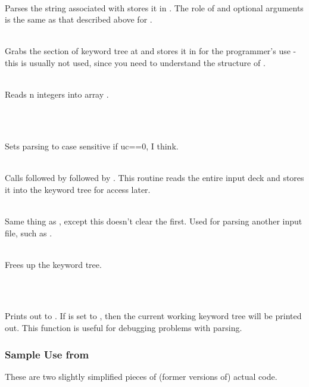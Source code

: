 \\
Parses the string associated with  stores it in .
The role of  and optional arguments is the same as that
described above for .

 \\
Grabs the section of keyword tree at  and stores it in 
for the programmer's use - this is usually not used, since you need to 
understand the structure of .

 \\
Reads n integers into array .

\begin{center}  \\ \end{center}

 \\
Sets parsing to case sensitive if uc==0, I think.

 \\
Calls  followed by  followed by 
.  This routine reads the entire input deck
and stores it into the keyword tree for access later.

 \\
Same thing as , except this doesn't clear the 
 first.  Used for parsing another input file, such 
as .

 \\
Frees up the keyword tree.

\begin{center}  \\ \end{center}

 \\
Prints out  to . If  is set to ,
then the current working keyword tree will be printed out.
This function is useful for debugging problems with parsing.

\subsubsection{Sample Use from \PSIcscf}
These are two slightly simplified pieces of (former versions of) actual code.  

